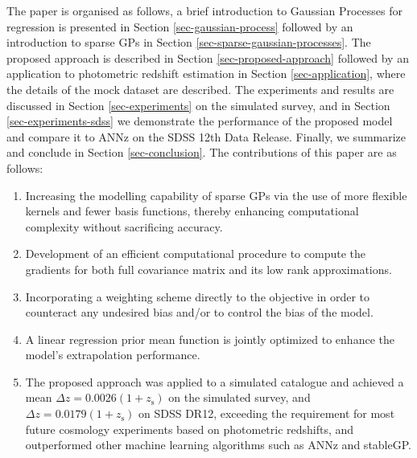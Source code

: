 \documentclass[useAMS,usenatbib,fleqn]{mn2e}
\begin{document}
The paper is organised as follows, a brief introduction to Gaussian Processes for regression is presented in Section \ref{sec-gaussian-process} followed by an introduction to sparse GPs in Section \ref{sec-sparse-gaussian-processes}. The proposed approach is described in Section \ref{sec-proposed-approach} followed by an application to photometric redshift estimation in Section \ref{sec-application}, where the details of the mock dataset are described. The experiments and results are discussed in Section \ref{sec-experiments} on the simulated survey, and in Section \ref{sec-experiments-sdss} we demonstrate the performance of the proposed model and compare it to ANNz on the SDSS 12th Data Release. Finally, we summarize and conclude in Section \ref{sec-conclusion}. The contributions of this paper are as follows:
\begin{enumerate}
  \item Increasing the modelling capability of sparse GPs via the use of more flexible kernels and fewer basis functions, thereby enhancing computational complexity without sacrificing accuracy.
  \item Development of an efficient computational procedure to compute the gradients for both full covariance matrix and its low rank approximations.
  \item Incorporating a weighting scheme directly to the objective in order to counteract any undesired bias and/or to control the bias of the model. 
  \item A linear regression prior mean function is jointly optimized to enhance the model's extrapolation performance.
  \item The proposed approach was applied to a simulated catalogue and achieved  a mean $\Delta z = 0.0026(1+z_\textrm{s})$ on the simulated survey, and  $\Delta z = 0.0179(1+z_\textrm{s})$ on SDSS DR12, exceeding the requirement for most future cosmology experiments based on photometric redshifts, and outperformed other machine learning algorithms such as {\sc ANNz} and {\sc stableGP}.
\end{enumerate}
\end{document}
